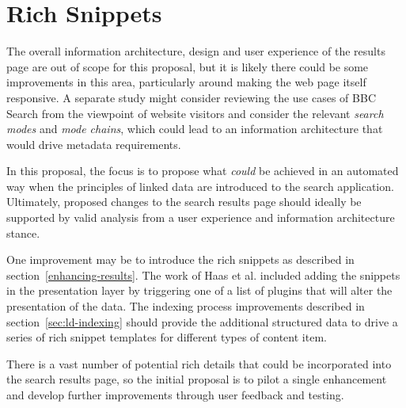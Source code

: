 \section{Rich Snippets}

The overall information architecture, design and user experience of
the results page are out of scope for this proposal, but it is likely
there could be some improvements in this area, particularly around making
the web page itself responsive\cite{marcotte2010responsive}. A separate
study might consider reviewing the use cases of BBC Search from
the viewpoint of website visitors and consider the relevant
\emph{search modes} and \emph{mode chains}\cite{russell2012designing},
which could lead to
an information architecture that would drive metadata requirements.

In this proposal, the focus is to propose what \emph{could} be
achieved in an automated way when the principles of linked data
are introduced to the search application. Ultimately, proposed
changes to the search results page should ideally be supported
by valid analysis from a user experience and information
architecture stance.

One improvement may be to introduce the rich snippets as described
in section~\ref{enhancing-results}. The work of Haas et
al.\cite{haas2011enhanced} included adding the snippets in the presentation
layer by triggering one of a list of plugins that will alter the
presentation of the data. The indexing process improvements
described in section~\ref{sec:ld-indexing} should provide the
additional structured data to drive a series of rich snippet templates
for different types of content item.

There is a vast number of potential rich details that could be
incorporated into the search results page, so the initial proposal
is to pilot a single enhancement and develop further improvements
through user feedback and testing.

